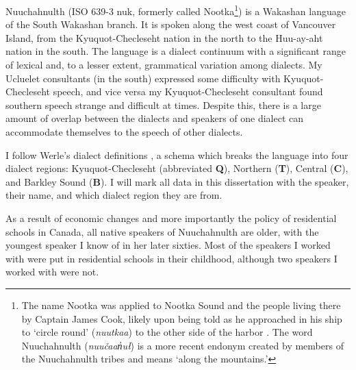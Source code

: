 Nuuchahnulth (ISO 639-3 nuk, formerly called Nootka\footnote{The name Nootka was applied to Nootka Sound and the people living there by Captain James Cook, likely upon being told as he approached in his ship to `circle round' (\textit{nuutkaa}) to the other side of the harbor \citep[p.~396]{campbell1997}. The word Nuuchahnulth (\textit{nuučaan̓uł}) is a more recent endonym created by members of the Nuuchahnulth tribes and means `along the mountains.'}) is a Wakashan language of the South Wakashan branch. It is spoken along the west coast of Vancouver Island, from the Kyuquot-Checleseht nation in the north to the Huu-ay-aht nation in the south. The language is a dialect continuum with a significant range of lexical and, to a lesser extent, grammatical variation among dialects. My Ucluelet consultants (in the south) expressed some difficulty with Kyuquot-Checleseht speech, and vice versa my Kyuquot-Checleseht consultant found southern speech strange and difficult at times. Despite this, there is a large amount of overlap between the dialects and speakers of one dialect can accommodate themselves to the speech of other dialects.

I follow Werle's dialect definitions \citep{werle2013dialects, werle2015b}, a schema which breaks the language into four dialect regions: Kyuquot-Checleseht (abbreviated \textbf{Q}), Northern (\textbf{T}), Central (\textbf{C}), and Barkley Sound (\textbf{B}). I will mark all data in this dissertation with the speaker, their name, and which dialect region they are from.

As a result of economic changes and more importantly the policy of residential schools in Canada, all native speakers of Nuuchahnulth are older, with the youngest speaker I know of in her later sixties. Most of the speakers I worked with were put in residential schools in their childhood, although two speakers I worked with were not.

